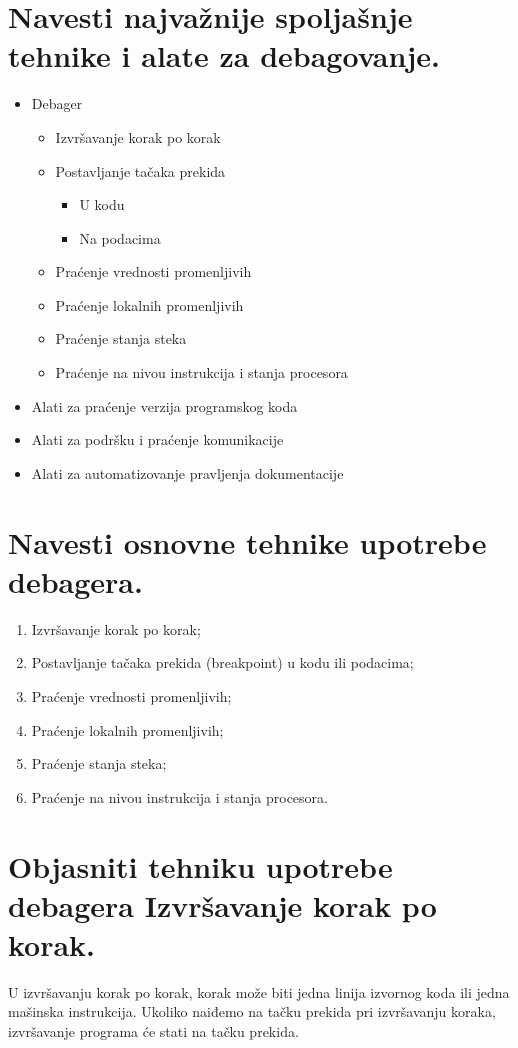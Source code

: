 \documentclass[a4paper]{article}
\begin{document}
\section{Navesti najvažnije spoljašnje tehnike i alate za debagovanje.}
  \begin{itemize}
    \item Debager
      \begin{itemize}
        \item Izvršavanje korak po korak
        \item Postavljanje tačaka prekida
          \begin{itemize}
            \item U kodu
            \item Na podacima
          \end{itemize}
        \item Praćenje vrednosti promenljivih
        \item Praćenje lokalnih promenljivih
        \item Praćenje stanja steka
        \item Praćenje na nivou instrukcija i stanja procesora
      \end{itemize}
    \item Alati za praćenje verzija programskog koda
    \item Alati za podršku i praćenje komunikacije
    \item Alati za automatizovanje pravljenja dokumentacije
  \end{itemize}


\section{Navesti osnovne tehnike upotrebe debagera.}
  \begin{enumerate}
    \item Izvršavanje korak po korak;
    \item Postavljanje tačaka prekida (breakpoint) u kodu ili podacima;
    \item Praćenje vrednosti promenljivih;
    \item Praćenje lokalnih promenljivih;
    \item Praćenje stanja steka;
    \item Praćenje na nivou instrukcija i stanja procesora.
  \end{enumerate}

\section{Objasniti tehniku upotrebe debagera Izvršavanje korak po korak.}
  U izvršavanju korak po korak, korak može biti jedna linija izvornog koda ili jedna mašinska 
  instrukcija. Ukoliko naiđemo na tačku prekida pri izvršavanju koraka, izvršavanje programa će 
  stati na tačku prekida.
\end{document}
